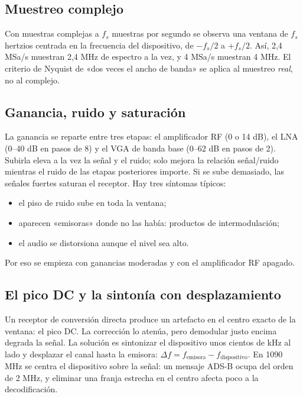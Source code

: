 \subsection{Muestreo complejo}

Con muestras complejas a $f_s$ muestras por segundo se observa una ventana de $f_s$ hertzios centrada en la frecuencia del dispositivo, de $-f_s/2$ a $+f_s/2$. Así, 2,4 MSa/s muestran 2,4 MHz de espectro a la vez, y 4 MSa/s muestran 4 MHz. El criterio de Nyquist de «dos veces el ancho de banda» se aplica al muestreo \emph{real}, no al complejo.

\subsection{Ganancia, ruido y saturación}

La ganancia se reparte entre tres etapas: el amplificador RF (0 o 14 dB), el LNA (0--40 dB en pasos de 8) y el VGA de banda base (0--62 dB en pasos de 2). Subirla eleva a la vez la señal y el ruido; solo mejora la relación señal/ruido mientras el ruido de las etapas posteriores importe. Si se sube demasiado, las señales fuertes saturan el receptor. Hay tres síntomas típicos:
\begin{itemize}
  \item el piso de ruido sube en toda la ventana;
  \item aparecen «emisoras» donde no las había: productos de intermodulación;
  \item el audio se distorsiona aunque el nivel sea alto.
\end{itemize}
Por eso se empieza con ganancias moderadas y con el amplificador RF apagado.

\subsection{El pico DC y la sintonía con desplazamiento}

Un receptor de conversión directa produce un artefacto en el centro exacto de la ventana: el pico DC. La corrección  lo atenúa, pero demodular justo encima degrada la señal. La solución es sintonizar el dispositivo unos cientos de kHz al lado y desplazar el canal hasta la emisora: $\Delta f = f_{\mathrm{emisora}} - f_{\mathrm{dispositivo}}$. En 1090 MHz se centra el dispositivo sobre la señal: un mensaje ADS-B ocupa del orden de 2 MHz, y eliminar una franja estrecha en el centro afecta poco a la decodificación.

